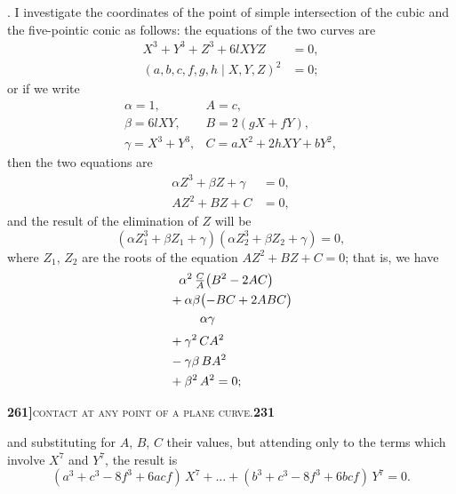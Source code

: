 \documentclass[11pt]{article}
\newcommand{\Cdel}{\mid}
\begin{document}
\medskip

. I investigate the coordinates of the point of simple intersection of the cubic and the five-pointic conic as follows: the equations of the two curves are
\[
\begin{aligned}
  X^3 + Y^3 + Z^3 + 6lXYZ &= 0,\\
  (a, b, c, f, g, h \Cdel X, Y, Z)^2 &= 0;
\end{aligned}
\]
or if we write
\[
\begin{array}{ll}
  \alpha = 1, & A = c,\\
  \beta = 6lXY, & B = 2(gX + fY),\\
  \gamma = X^3 + Y^3, & C = aX^2 + 2hXY + bY^2,
\end{array}
\]
then the two equations are
\[
\begin{aligned}
  \alpha Z^3 + \beta Z + \gamma &= 0,\\
  A Z^2 + B Z + C &= 0,
\end{aligned}
\]
and the result of the elimination of $Z$ will be
\[
  (\alpha Z_1^3 + \beta Z_1 + \gamma)(\alpha Z_2^3 + \beta Z_2 + \gamma) = 0,
\]
where $Z_1$, $Z_2$ are the roots of the equation $AZ^2 + BZ + C = 0$; that is, we have
\[
\begin{aligned}
  &\phantom{+{}} \alpha^2\,\tfrac{C}{A}\bigl(B^2 - 2AC\bigr)\\
  &{} + \alpha\beta\bigl(-BC + 2ABC\bigr)\\
  &\hphantom{xxxx}\,\alpha\gamma\\[2pt]
  &{} + \gamma^2\,CA^2\\
  &{} - \gamma\beta\,BA^2\\
  &{} + \beta^2\,A^2 = 0;
\end{aligned}
\]

\newpage
\noindent\textbf{261]}\hfill\textsc{contact at any point of a plane curve.}\hfill\textbf{231}

\medskip

\noindent and substituting for $A$, $B$, $C$ their values, but attending only to the terms which involve $X^7$ and $Y^7$, the result is
\[
  (a^3 + c^3 - 8f^3 + 6acf)\,X^7 + \ldots + (b^3 + c^3 - 8f^3 + 6bcf)\,Y^7 = 0.
\]

\medskip
\end{document}
